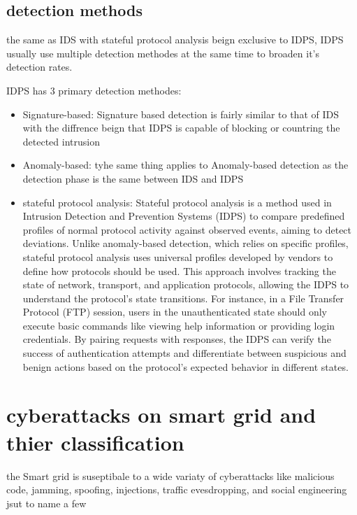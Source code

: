 \subsection{detection methods}

the same as IDS with stateful protocol analysis beign exclusive to IDPS, IDPS usually use multiple detection methodes at the same time to broaden it's detection rates. \cite{NIST-IDPS}

IDPS has 3 primary detection methodes:


\begin{itemize}
	\item Signature-based: Signature based detection is fairly similar to that of IDS with the diffrence beign that IDPS is capable of blocking or countring the detected intrusion
	\item Anomaly-based: tyhe same thing applies to Anomaly-based detection as the detection phase is the same between IDS and IDPS
	\item stateful protocol analysis: Stateful protocol analysis is a method used in Intrusion Detection and Prevention Systems (IDPS) to compare predefined profiles of normal protocol activity against observed events, aiming to detect deviations. Unlike anomaly-based detection, which relies on specific profiles, stateful protocol analysis uses universal profiles developed by vendors to define how protocols should be used. This approach involves tracking the state of network, transport, and application protocols, allowing the IDPS to understand the protocol's state transitions. For instance, in a File Transfer Protocol (FTP) session, users in the unauthenticated state should only execute basic commands like viewing help information or providing login credentials. By pairing requests with responses, the IDPS can verify the success of authentication attempts and differentiate between suspicious and benign actions based on the protocol's expected behavior in different states. \cite{NIST-IDPS19-20}
\end{itemize}









\section{cyberattacks on smart grid and thier classification}
the Smart grid is suseptibale to a wide variaty of cyberattacks like malicious code, jamming, spoofing, injections, traffic evesdropping, and social engineering jsut to name a few


